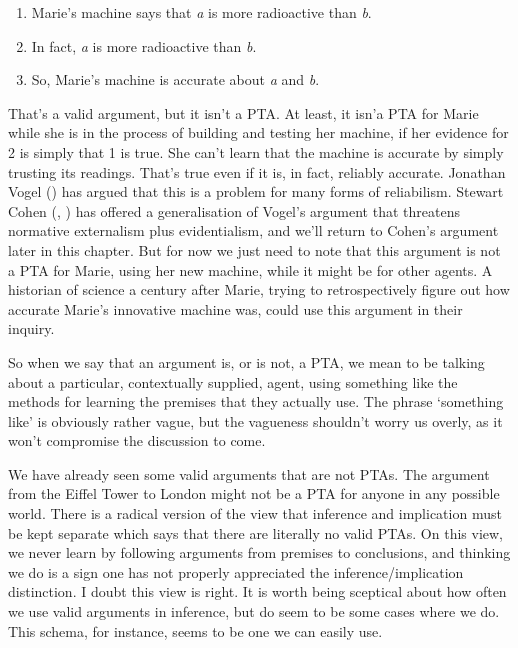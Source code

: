 \documentclass[
  10pt,
  letterpaper,
  twoside]{scrbook}
\providecommand{\tightlist}{%
  \setlength{\itemsep}{0pt}\setlength{\parskip}{0pt}}\usepackage{longtable,booktabs,array}
\begin{document}
\begin{enumerate}
\def\labelenumi{\arabic{enumi}.}
\tightlist
\item
  {Marie}'s machine says that \emph{a} is more radioactive than
  \emph{b}.
\item
  In fact, \emph{a} is more radioactive than \emph{b}.
\item
  So, {Marie}'s machine is accurate about \emph{a} and \emph{b}.
\end{enumerate}

That's a valid argument, but it isn't a PTA. At least, it isn'a PTA for
{Marie} while she is in the process of building and testing her machine,
if her evidence for 2 is simply that 1 is true. She can't learn that the
machine is accurate by simply trusting its readings. That's true even if
it is, in fact, reliably accurate. Jonathan Vogel
() has argued that this is a problem for
many forms of reliabilism. Stewart Cohen
(, ) has
offered a generalisation of Vogel's argument that threatens normative
externalism plus evidentialism, and we'll return to Cohen's argument
later in this chapter. But for now we just need to note that this
argument is not a PTA for {Marie}, using her new machine, while it might
be for other agents. A historian of science a century after {Marie},
trying to retrospectively figure out how accurate {Marie}'s innovative
machine was, could use this argument in their inquiry.

So when we say that an argument is, or is not, a PTA, we mean to be
talking about a particular, contextually supplied, agent, using
something like the methods for learning the premises that they actually
use. The phrase `something like' is obviously rather vague, but the
vagueness shouldn't worry us overly, as it won't compromise the
discussion to come.

We have already seen some valid arguments that are not PTAs. The
argument from the Eiffel Tower to London might not be a PTA for anyone
in any possible world. There is a radical version of the view that
inference and implication must be kept separate which says that there
are literally no valid PTAs. On this view, we never learn by following
arguments from premises to conclusions, and thinking we do is a sign one
has not properly appreciated the inference/implication distinction. I
doubt this view is right. It is worth being sceptical about how often we
use valid arguments in inference, but do seem to be some cases where we
do. This schema, for instance, seems to be one we can easily use.
\end{document}
